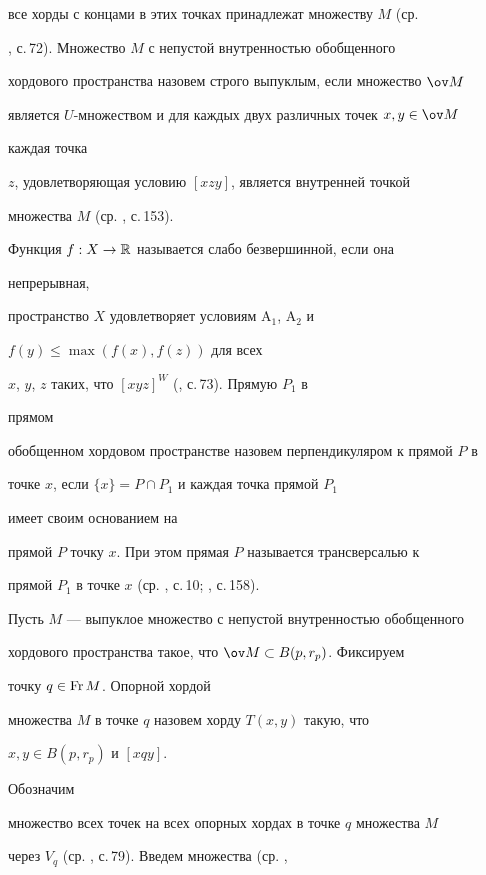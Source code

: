 все хорды с концами в этих точках принадлежат множеству $M$ (ср. 


\cite{1}, с.\,72). Множество $M$ с непустой внутренностью обобщенного 


хордового пространства назовем строго выпуклым, если множество $\ov M$ 


является $U$-множеством и для каждых двух различных точек $x,y\in\ov M$ 


каждая точка 


$z$, удовлетворяющая условию $[xzy]$, является внутренней точкой 


множества $M$ (ср. \cite{2}, с.\,153). 


 


Функция $f:X\to\Bbb R$ называется слабо безвершинной, если она 


непрерывная, 


пространство $X$ удовлетворяет условиям A${}_1$, A${}_2$ и 


$f(y)\le\max(f(x),f(z))$ для всех 


$x$, $y$, $z$ таких, что $[xyz]^W$ (\cite{1}, с.\,73). Прямую $P_1$ в 


прямом 


обобщенном хордовом пространстве назовем перпендикуляром к прямой $P$ в 


точке $x$, если $\{x\}=P\cap P_1$ и каждая точка прямой $P_1$ 


имеет своим основанием на 


прямой $P$ точку $x$. При этом прямая $P$ называется трансверсалью к 


прямой $P_1$ в точке $x$ (ср. \cite{1}, с.\,10; \cite{2}, с.\,158). 


 


Пусть $M$ --- выпуклое множество с непустой внутренностью обобщенного 


хордового пространства такое, что $\ov M\subset B(p,r_p)$. Фиксируем 


точку $q\in\operatorname{Fr} M$. Опорной хордой 


множества $M$ в точке $q$ назовем хорду $T(x,y)$ такую, что 


$x,y\in B(p,r_p)$ и $[xqy]$. 


Обозначим 


множество всех точек на всех опорных хордах в точке $q$ множества $M$ 


через $V_q$ (ср. \cite{1}, с.\,79). Введем множества (ср. \cite{1}, 


